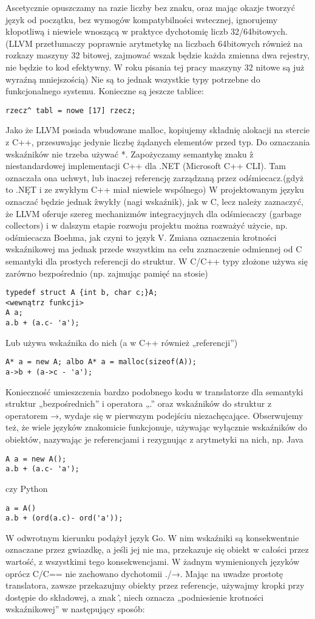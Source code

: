 Ascetycznie opuszczamy na razie liczby bez znaku, oraz mając okazje tworzyć język od początku, bez wymogów kompatybilności wstecznej, ignorujemy kłopotliwą i niewiele wnoszącą w praktyce dychotomię liczb 32/64bitowych. (LLVM przetłumaczy poprawnie arytmetykę na liczbach 64bitowych również na rozkazy maszyny 32 bitowej, zajmować wszak będzie każda zmienna dwa rejestry, nie będzie to kod efektywny. W roku pisania tej pracy maszyny 32 nitowe są już wyraźną mniejszością)
Nie są to jednak wszystkie typy potrzebne do funkcjonalnego systemu. Konieczne są jeszcze tablice:
\begin{lstlisting}
rzecz^ tabl = nowe [17] rzecz;
\end{lstlisting}
Jako że LLVM posiada wbudowane malloc, kopiujemy składnię alokacji na stercie z C++, przesuwając jedynie liczbę żądanych elementów przed typ.
Do oznaczania wskaźników nie trzeba używać *. Zapożyczamy semantykę znaku \^ z niestandardowej implementacji C++ dla .NET (Microsoft C++ CLI). Tam oznaczała ona uchwyt, lub inaczej referencję zarządzaną przez odśmiecacz.(gdyż to .NĘT i ze zwykłym C++ miał niewiele wspólnego) W projektowanym języku oznaczać będzie jednak \^ zwykły (nagi wskaźnik), jak w C, lecz należy zaznaczyć, że LLVM oferuje szereg mechanizmów integracyjnych dla odśmiecaczy (garbage collectors) i w dalszym etapie rozwoju projektu można rozważyć użycie, np. odśmiecacza Boehma, jak czyni to język V.
Zmiana oznaczenia krotności wskaźnikowej ma jednak przede wszystkim na celu zaznaczenie odmiennej od C semantyki dla prostych referencji do struktur. W C/C++ typy złożone używa się zarówno bezpośrednio (np. zajmując pamięć na stosie)
\begin{lstlisting}
typedef struct A {int b, char c;}A;
<wewnątrz funkcji>
A a;
a.b + (a.c- 'a');
\end{lstlisting}
Lub używa wskaźnika do nich (a w C++ również „referencji”)
\begin{lstlisting}
A* a = new A; albo A* a = malloc(sizeof(A));
a->b + (a->c - 'a');
\end{lstlisting}
Konieczność umieszczenia bardzo podobnego kodu w translatorze dla semantyki struktur „bezpośrednich” i operatora „.” oraz wskaźników do struktur z operatorem →, wydaje się w pierwszym podejściu niezachęcające. Obserwujemy też, że wiele języków znakomicie funkcjonuje, używając wyłącznie wskaźników do obiektów, nazywając je referencjami i rezygnując z arytmetyki na nich, np. Java
\begin{lstlisting}
A a = new A(); 
a.b + (a.c- 'a');
\end{lstlisting}
czy Python
\begin{lstlisting}
a = A() 
a.b + (ord(a.c)- ord('a'));
\end{lstlisting}
W odwrotnym kierunku podążył język Go. W nim wskaźniki są konsekwentnie oznaczane przez gwiazdkę, a jeśli jej nie ma, przekazuje się obiekt w całości przez wartość, z wszystkimi tego konsekwencjami.
W żadnym wymienionych języków oprócz C/C== nie zachowano dychotomii ./→.
Mając na uwadze prostotę translatora, zawsze przekazujmy obiekty przez referencje, używajmy kropki przy dostępie do składowej, a znak \^, niech oznacza „podniesienie krotności wskaźnikowej” w następujący sposób:

